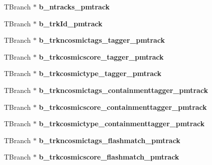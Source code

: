 \begin{DoxyCompactItemize}
\item 
\hypertarget{classanatree_ac4bc45c259ca755ad90c0a5ea5c99ef2}{T\-Branch $\ast$ {\bfseries b\-\_\-ntracks\-\_\-pmtrack}}\label{classanatree_ac4bc45c259ca755ad90c0a5ea5c99ef2}

\item 
\hypertarget{classanatree_ae4581986c9bf7a70e5f6f60daed8c13b}{T\-Branch $\ast$ {\bfseries b\-\_\-trk\-Id\-\_\-pmtrack}}\label{classanatree_ae4581986c9bf7a70e5f6f60daed8c13b}

\item 
\hypertarget{classanatree_a5a5992e116d6ddedab039dc81bdaa81a}{T\-Branch $\ast$ {\bfseries b\-\_\-trkncosmictags\-\_\-tagger\-\_\-pmtrack}}\label{classanatree_a5a5992e116d6ddedab039dc81bdaa81a}

\item 
\hypertarget{classanatree_acea80ce051ac4c151ff166324d320ea6}{T\-Branch $\ast$ {\bfseries b\-\_\-trkcosmicscore\-\_\-tagger\-\_\-pmtrack}}\label{classanatree_acea80ce051ac4c151ff166324d320ea6}

\item 
\hypertarget{classanatree_a8298ed44e725fbdeca0285e241ff0b8b}{T\-Branch $\ast$ {\bfseries b\-\_\-trkcosmictype\-\_\-tagger\-\_\-pmtrack}}\label{classanatree_a8298ed44e725fbdeca0285e241ff0b8b}

\item 
\hypertarget{classanatree_a9a433cf0b8b60c1b203eeb85943ec883}{T\-Branch $\ast$ {\bfseries b\-\_\-trkncosmictags\-\_\-containmenttagger\-\_\-pmtrack}}\label{classanatree_a9a433cf0b8b60c1b203eeb85943ec883}

\item 
\hypertarget{classanatree_a9f95ac753ddc4695f5bd2744ca1f101a}{T\-Branch $\ast$ {\bfseries b\-\_\-trkcosmicscore\-\_\-containmenttagger\-\_\-pmtrack}}\label{classanatree_a9f95ac753ddc4695f5bd2744ca1f101a}

\item 
\hypertarget{classanatree_a379540dbdb76f41552ff598f7084417d}{T\-Branch $\ast$ {\bfseries b\-\_\-trkcosmictype\-\_\-containmenttagger\-\_\-pmtrack}}\label{classanatree_a379540dbdb76f41552ff598f7084417d}

\item 
\hypertarget{classanatree_a32a1356cca07e211dd87055dff9509e7}{T\-Branch $\ast$ {\bfseries b\-\_\-trkncosmictags\-\_\-flashmatch\-\_\-pmtrack}}\label{classanatree_a32a1356cca07e211dd87055dff9509e7}

\item 
\hypertarget{classanatree_a31f69bca282d80ba19e9e2e8969c195c}{T\-Branch $\ast$ {\bfseries b\-\_\-trkcosmicscore\-\_\-flashmatch\-\_\-pmtrack}}\label{classanatree_a31f69bca282d80ba19e9e2e8969c195c}


\end{DoxyCompactItemize}
